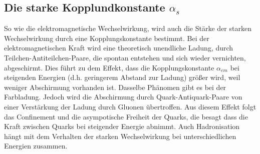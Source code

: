 
\subsection{Die starke Kopplundkonstante $\alpha_s$}\label{sec:alpha}
So wie die elektromagnetische Wechselwirkung, wird auch die Stärke der starken Wechselwirkung durch eine Kopplungskonstante bestimmt. Bei der elektromagnetischen Kraft wird eine theoretisch unendliche Ladung, durch Teilchen-Antiteilchen-Paare, die spontan entstehen und sich wieder vernichten, abgeschirmt. Dies führt zu dem Effekt, dass die Kopplungskonstante $\alpha_{em}$ bei steigenden Energien (d.h. geringerem Abstand zur Ladung) größer wird, weil weniger Abschirmung vorhanden ist\cite{halzen2008quark}. Dasselbe Phänomen gibt es bei der Farbladung. Jedoch wird die Abschirmung durch Quark-Antiquark-Paare von einer Verstärkung der Ladung durch Gluonen übertroffen. Aus diesem Effekt folgt das Confinement und die asympotische Freiheit der Quarks, die besagt dass die Kraft zwischen Quarks bei steigender Energie abnimmt. Auch Hadronisation hängt mit dem Verhalten der starken Wechselwirkung bei unterschiedlichen Energien zusammen.

